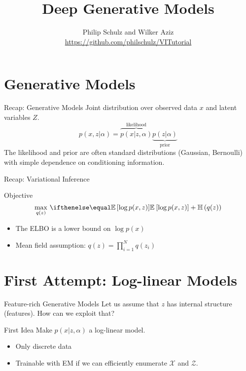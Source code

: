 \documentclass[14pt]{beamer}
\title{Deep Generative Models}
\author{Philip Schulz and Wilker Aziz\\
\url{https://github.com/philschulz/VITutorial}}
\date{}
\begin{document}
\begin{frame}
\maketitle
\end{frame}

\frame{\tableofcontents}

\section{Generative Models}
\frame{\tableofcontents[currentsection]}

\begin{frame}{Recap: Generative Models}
Joint distribution over observed data $ x $ and latent variables $ Z $.
\begin{equation*}
p(x,z|\alpha) = \overbrace{p(x|z,\alpha)}^{\text{likelihood}} \underbrace{p(z|\alpha)}_{\text{prior}}
\end{equation*} 
The likelihood and prior are often standard distributions (Gaussian, Bernoulli) with simple dependence on conditioning
information.
\end{frame}

\begin{frame}{Recap: Variational Inference}
\begin{block}{Objective}
\begin{equation*}
\underset{q(z)}{\max}~\E{\log p(x,z)} + \Ent{q(z)}
\end{equation*}
\begin{itemize}
\item The ELBO is a lower bound on $ \log p(x) $
\item Mean field assumption: $ q(z) = \prod_{i=1}^{N}q(z_{i}) $
\end{itemize}
\end{block}
\end{frame}

\section{First Attempt: Log-linear Models}
\frame{\tableofcontents[currentsection]}

\begin{frame}{Feature-rich Generative Models}
Let us assume that $ z $ has internal structure (features). How can we exploit that?
\begin{block}{First Idea}
Make $ p(x|z,\alpha) $ a log-linear model.
\begin{itemize}
\item Only discrete data
\item Trainable with EM if we can efficiently enumerate $ \mathcal{X} $ and $ \mathcal{Z} $.
\end{itemize}
\end{block}
\end{frame}
\end{document}
